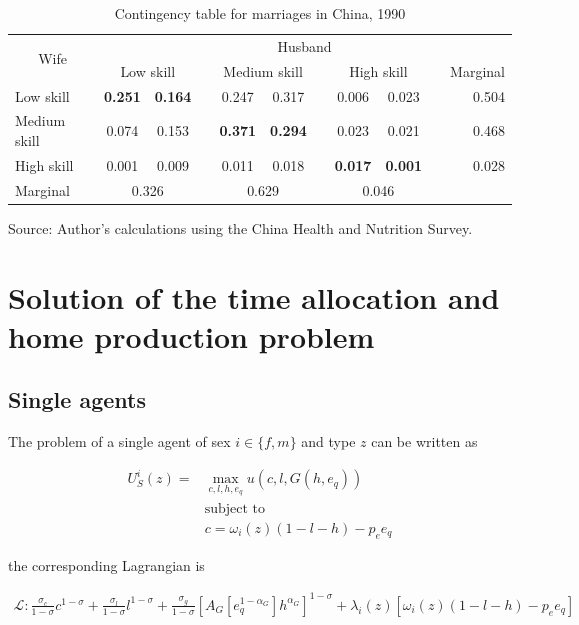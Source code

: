 \documentclass[12pt]{article}
\newcommand{\source}[1]{\caption*{Source: {#1}} }
\begin{document}
\begin{table}[htbp]
	\centering
	\caption{Contingency table for marriages in China, 1990}
	\begin{tabular}{lccrccrccrr}
		\toprule
		\multicolumn{1}{c}{\multirow{2}[4]{*}{Wife}} & \multicolumn{10}{c}{Husband} \\
		\cmidrule{2-11}      & \multicolumn{2}{c}{Low skill} &       & \multicolumn{2}{c}{Medium skill} &       & \multicolumn{2}{c}{High skill} &       & \multicolumn{1}{l}{Marginal} \\
		\midrule
		Low skill & \textbf{0.251} & \textbf{0.164} &       & 0.247 & 0.317 &       & 0.006 & 0.023 &       & 0.504 \\
		Medium skill & 0.074 & 0.153 &       & \textbf{0.371} & \textbf{0.294} &       & 0.023 & 0.021 &       & 0.468 \\
		High skill & 0.001 & 0.009 &       & 0.011 & 0.018 &       & \textbf{0.017} & \textbf{0.001} &       & 0.028 \\
		Marginal & \multicolumn{2}{c}{0.326} &       & \multicolumn{2}{c}{0.629} &       & \multicolumn{2}{c}{0.046} &       &  \\
		\bottomrule
		\bottomrule
	\end{tabular}
	\label{tab:cont_tab_1990}
	\source{Author's calculations using the China Health and Nutrition Survey.}
\end{table}

\section{Solution of the time allocation and home production problem} \label{sec:timeallocationappendix}

\subsection*{Single agents}

The problem of a single agent of sex $i\in\{f,m\}$ and type $z$ can be written as

\begin{align*}
U_S^i\left(z\right) = & \max_{c,l,h,e_q} u\left(c,l,G\left(h,e_q\right)\right) \\
& \text{subject to} \\
& c = \omega_i\left(z\right)\left(1-l-h\right)-p_e e_q
\end{align*}

the corresponding Lagrangian is

\begin{align*}
	\mathcal{L}: \frac{\sigma_c}{1-\sigma}c^{1-\sigma}+\frac{\sigma_l}{1-\sigma}l^{1-\sigma}+\frac{\sigma_g}{1-\sigma}\left[A_G\left[e_q^{1-\alpha_G}\right]h^{\alpha_G}\right]^{1-\sigma}+\lambda_i(z)\left[\omega_i\left(z\right)\left(1-l-h\right)-p_e e_q\right]
\end{align*} 
\end{document}
